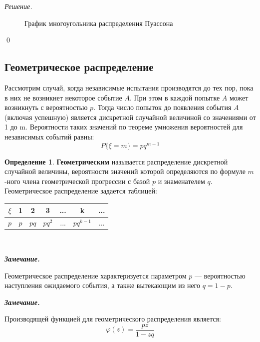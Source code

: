 \documentclass[12pt,a4paper]{article}
\theoremstyle{definition}
\newtheorem{definition}{Определение}[section]
\theoremstyle{definition}
\theoremstyle{remark}
\newenvironment{remark}{
  \par\noindent\textbf{\textit{Замечание.}}~
}{\par}
\theoremstyle{corollary}
\theoremstyle{bolditalic}
\newenvironment{solution}{
    \vspace{0.5em}
    \noindent\textit{Решение.}
}{\qed\vspace{1em}}
\begin{document}
\begin{solution}
\begin{figure}[h!]
    \caption{График многоугольника распределения Пуассона}
\end{figure}

\end{solution}

\subsection{Геометрическое распределение}

Рассмотрим случай, когда независимые испытания производятся до тех пор, пока в них не возникнет некоторое событие $A$. При этом в каждой попытке $A$ может возникнуть с вероятностью $p$. Тогда число попыток до появления события $A$ (включая успешную) является дискретной случайной величиной со значениями от 1 до m. Вероятности таких значений по теореме умножения вероятностей для независимых событий равны:
\[
P\{\xi=m\}=pq^{m-1}
\]

\begin{definition}
    \textbf{Геометрическим} называется распределение дискретной случайной величины, вероятности значений которой определяются по формуле $m$-ного члена геометрической прогрессии с базой $p$ и знаменателем $q$. Геометрическое распределение задается таблицей:\\

     \centering
\begin{tabular}{|c|c|c|c|c|c|c|}
\hline
$\xi$ & 1 & 2 & 3 & ... & k & ... \\
\hline
$p$ & $p$ & $pq$ & $pq^2$ & ... & $pq^{k-1}$ & ... \\
\hline
\end{tabular}\\
    
\end{definition}

\begin{remark}
 Геометрическое распределение характеризуется параметром $p$ --- вероятностью наступления ожидаемого события, а также вытекающим из него $q=1-p$.
\end{remark}
\begin{remark}
 Производящей функцией для геометрического распределения является:
 \[
 \varphi(z)=\frac{pz}{1-zq}
 \]
\end{remark}
\end{document}
